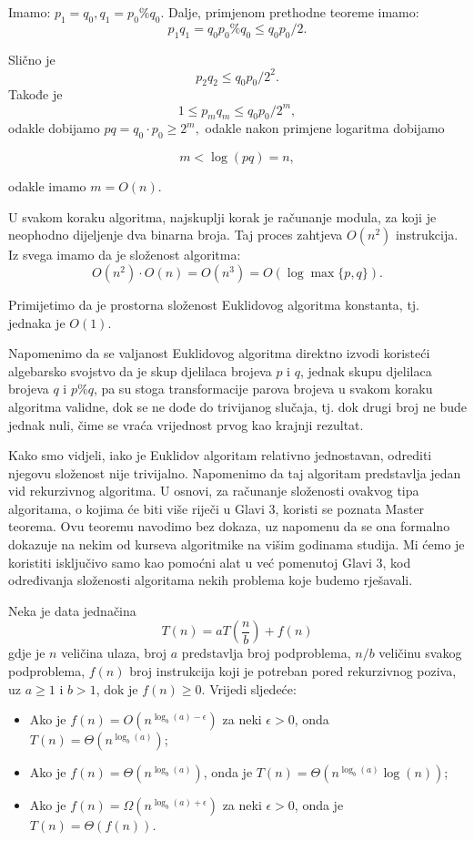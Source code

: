 \begin{example}
	Imamo: $p_1 = q_0, q_1 = p_0 \%q_0. $ Dalje, primjenom prethodne teoreme imamo: 
	$$ p_1 q_1 = q_0 p_0 \% q_0  \leq q_0 p_0 /2.$$
	
	Slično je 
		$$ p_2 q_2 \leq q_0 p_0 /2^2 .$$
Takođe je 
		$$ 1  \leq p_m q_m \leq q_0 p_0 /2^m, $$
odakle dobijamo $pq =  q_0 \cdot p_0 \geq 2^m, $ odakle nakon primjene logaritma dobijamo 

$$   m < \log (pq ) = n,$$

odakle imamo $m = O(n)$.

U svakom koraku algoritma, najskuplji korak je računanje modula, za koji je neophodno dijeljenje dva binarna broja. Taj proces zahtjeva $O(n^2)$ instrukcija. 
Iz svega imamo da je složenost algoritma:
$$ O(n^2)\cdot O(n) = O(n^3)= O(\log \max\{p,q\}).$$

Primijetimo da je prostorna složenost Euklidovog algoritma konstanta, tj. jednaka je $O(1)$. 
\end{example}


Napomenimo da se valjanost Euklidovog algoritma direktno izvodi  koriste\-ći algebarsko svojstvo da je skup djelilaca brojeva $p$ i $q$, jednak skupu djelilaca brojeva $q$ i $p\%q$, pa su stoga transformacije parova brojeva u svakom koraku algoritma validne, dok se ne dođe do trivijanog slučaja, tj. dok drugi broj ne bude jednak nuli, čime se vraća vrijednost prvog kao krajnji rezultat. 

Kako smo vidjeli, iako je Euklidov algori\-tam relativno jednostavan, odrediti njegovu složenost nije trivijalno. Napomenimo da taj algoritam predstavlja jedan vid rekurzivnog algoritma.  %
 U osnovi, za računanje složeno\-sti ovakvog tipa algoritama, o kojima će biti više riječi u Glavi 3, koristi se poznata Master teorema. Ovu teoremu navodimo bez dokaza, uz napomenu da se ona  formalno dokazuje na nekim od kurseva algoritmike na višim godinama studija. Mi ćemo je koristiti isključivo samo kao pomoćni alat u već pomenutoj Glavi 3, kod određivanja složenosti algoritama nekih problema koje budemo rješavali. 

\begin{theorem}
	Neka je data jednačina 
$$T(n) = aT\left(\frac{n}{b}\right) + f(n)$$
gdje je  $n$  veličina ulaza, broj $a$ predstavlja  broj podproblema,
$n/b$ veličinu svakog podproblema, $f(n)$ broj instrukcija koji je potreban pored rekurzivnog poziva, uz $a\geq 1$ i $b>1$, dok je $f(n)\geq 0$. Vrijedi sljedeće:
\begin{itemize}
	\item Ako je $f(n) = O(n^{\log_b (a) - \epsilon})$ za neki $\epsilon>0$, onda $ T(n) = \Theta (n^{\log_b (a)})$;
	\item Ako je $f(n) = \Theta (n^{\log_b (a)})$, onda je $T(n) = \Theta (n^{\log_b (a)} \log(n))$;
	\item Ako je $f(n) = \Omega (n^{\log_b (a) + \epsilon})$  za neki $\epsilon>0$, onda je $T(n) = \Theta (f(n))$. 
	
\end{itemize}
\end{theorem} 

